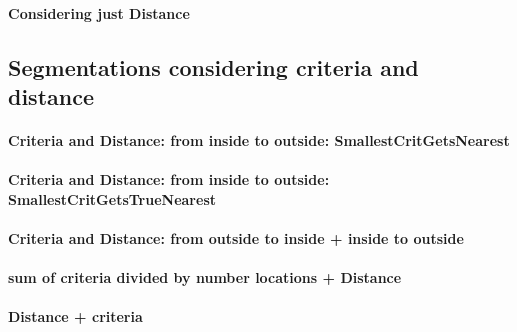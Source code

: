 \paragraph{Considering just Distance}

\subsection{Segmentations considering criteria and distance}

\paragraph{Criteria and Distance: from inside to outside: SmallestCritGetsNearest}

\paragraph{Criteria and Distance: from inside to outside: SmallestCritGetsTrueNearest}

\paragraph{Criteria and Distance: from outside to inside + inside to outside}

\paragraph{sum of criteria divided by number locations + Distance}

\paragraph{Distance + criteria}

